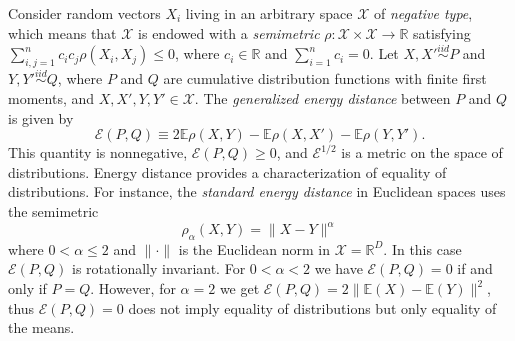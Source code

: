 \documentclass[twoside]{article}
\newcommand\Energy{\mathcal{E}}
\newcommand\E{\mathbb{E}}
\begin{document}
Consider random vectors $X_i$ living in an arbitrary space
$\mathcal{X}$ of \emph{negative type}, which means that $\mathcal{X}$
is endowed with a \emph{semimetric} 
$\rho: \mathcal{X}\times\mathcal{X} \to \mathbb{R}$ satisfying
$\sum_{i,j=1}^n c_i c_j \rho(X_i, X_j) \le 0$,
where $c_i \in \mathbb{R}$ and
$\sum_{i=1}^n c_i = 0$. 
Let $X,X' \stackrel{iid}{\sim} P$ and 
$Y,Y' \stackrel{iid}{\sim} Q$, where $P$ and $Q$ are cumulative
distribution functions with finite first moments, and 
$X,X',Y,Y' \in \mathcal{X}$. 
The \emph{generalized energy distance} between $P$ and $Q$ is
given by 
\begin{equation}
\label{eq:energy3}
\Energy(P, Q) \equiv 2 \E \rho(X,Y) - \E \rho(X, X') - \E \rho(Y,Y').
\end{equation} 
This quantity is nonnegative, $\Energy(P,Q) \ge 0$, and 
$\Energy^{1/2}$ is
a metric on the space of distributions. Energy distance provides
a characterization of equality of distributions.
For instance, the \emph{standard
energy distance} \citep{Szkely2013} in Euclidean spaces uses
the semimetric
\begin{equation}
\label{eq:rho_standard}
\rho_\alpha(X,Y) = \| X - Y\|^\alpha
\end{equation} 
where $0< \alpha \le 2$ and $\| \cdot \|$ is the
Euclidean norm in $\mathcal{X}=\mathbb{R}^D$. In this case $\Energy(P,Q)$
is rotationally invariant. For $0<\alpha<2$ we have
$\Energy(P,Q) = 0$ if and only if $P=Q$. However, for $\alpha=2$
we get $\Energy(P,Q) = 2\| \E(X) - \E(Y) \|^2$, thus
$\Energy(P,Q)=0$ does 
not imply equality of distributions but only equality
of the means.
 
\end{document}
